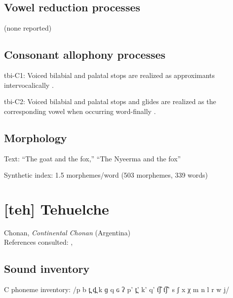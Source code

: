 {\subsection*{Vowel reduction processes}

(none reported)
\subsection*{Consonant allophony processes}
\begin{appendixdesc}

\item[tbi-C1:] Voiced bilabial and palatal stops are realized as approximants intervocalically \citep[25]{Stirtz2011}.

\item[tbi-C2:] Voiced bilabial and palatal stops and glides are realized as the corresponding vowel when occurring word-finally \citep{Stirtz2011}.
\end{appendixdesc}
\subsection*{Morphology}

\begin{appendixdesc}

\item[Text:] “The goat and the fox,” “The Nyeerma and the fox” \citep[319--326]{Stirtz2011}

\item[Synthetic index:] 1.5 morphemes/word (503 morphemes, 339 words)
\end{appendixdesc}

\section*{[teh] Tehuelche}  %
Chonan, \textit{Continental Chonan} (Argentina)\medskip\\
References consulted: \citet{FernándezGaray1998}, \citet{FernándezGarayHernández2006}

\subsection*{Sound inventory}
\begin{appendixdesc}

\item[C phoneme inventory:] /p b t̪ d̪ k ɡ q ɢ ʔ p’ t̪’ k’ q’ t͡ʃ t͡ʃ’ s ʃ x χ m n l r w j/


\end{appendixdesc}}
